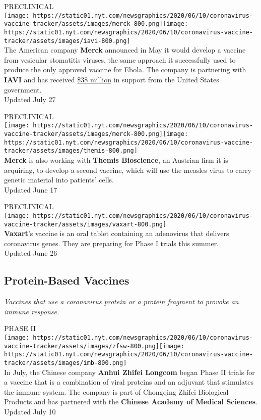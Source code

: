 PRECLINICAL\\
\texttt{[image: https://static01.nyt.com/newsgraphics/2020/06/10/coronavirus-vaccine-tracker/assets/images/merck-800.png]}\texttt{[image: https://static01.nyt.com/newsgraphics/2020/06/10/coronavirus-vaccine-tracker/assets/images/iavi-800.png]}\\
The American company \textbf{Merck} announced in May it would develop a
vaccine from vesicular stomatitis viruses, the same approach it
successfully used to produce the only approved vaccine for Ebola. The
company is partnering with \textbf{IAVI} and has received
\href{https://medicalcountermeasures.gov/newsroom/2020/merck-iavi/}{\$38
million} in support from the United States government.\\
Updated July 27

PRECLINICAL\\
\texttt{[image: https://static01.nyt.com/newsgraphics/2020/06/10/coronavirus-vaccine-tracker/assets/images/merck-800.png]}\texttt{[image: https://static01.nyt.com/newsgraphics/2020/06/10/coronavirus-vaccine-tracker/assets/images/themis-800.png]}\\
\textbf{Merck} is also working with \textbf{Themis Bioscience}, an
Austrian firm it is acquiring, to develop a second vaccine, which will
use the measles virus to carry genetic material into patients' cells.\\
Updated June 17

PRECLINICAL\\
\texttt{[image: https://static01.nyt.com/newsgraphics/2020/06/10/coronavirus-vaccine-tracker/assets/images/vaxart-800.png]}\\
\textbf{Vaxart}'s vaccine is an oral tablet containing an adenovirus
that delivers coronavirus genes. They are preparing for Phase I trials
this summer.\\
Updated June 26

\hypertarget{protein-based-vaccines}{%
\subsection{\texorpdfstring{\textbf{Protein-Based
Vaccines}}{Protein-Based Vaccines}}\label{protein-based-vaccines}}

\emph{Vaccines that use a coronavirus protein or a protein fragment to
provoke an immune response.}

PHASE II\\
\texttt{[image: https://static01.nyt.com/newsgraphics/2020/06/10/coronavirus-vaccine-tracker/assets/images/zfsw-800.png]}\texttt{[image: https://static01.nyt.com/newsgraphics/2020/06/10/coronavirus-vaccine-tracker/assets/images/imb-800.png]}\\
In July, the Chinese company \textbf{Anhui Zhifei Longcom} began Phase
II trials for a vaccine that is a combination of viral proteins and an
adjuvant that stimulates the immune system. The company is part of
Chongqing Zhifei Biological Products and has partnered with the
\textbf{Chinese Academy of Medical Sciences}.\\
Updated July 10


